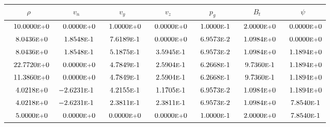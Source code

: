 \begin{tabular*}{\textwidth}{@{\extracolsep{\fill}} ccccccc}
\\ 
\hline 
\hline 
$\rho$ & $v_n$ & $v_y$ & $v_z$ & $p_g$ & $B_t$ & $\psi$ \\ 
\hline 
$\phantom{-} 10.0000\mbox{\sc{e}\smaller{+}}0$ & $\phantom{-} 0.0000\mbox{\sc{e}\smaller{+}}0$ & $\phantom{-} 1.0000\mbox{\sc{e}\smaller{+}}0$ & $\phantom{-} 0.0000\mbox{\sc{e}\smaller{+}}0$ & $\phantom{-} 1.0000\mbox{\sc{e}\smaller{-}}1$ & $\phantom{-} 2.0000\mbox{\sc{e}\smaller{+}}0$ & $\phantom{-} 0.0000\mbox{\sc{e}\smaller{+}}0$ \\ 
$\phantom{-} 8.0436\mbox{\sc{e}\smaller{+}}0$ & $\phantom{-} 1.8548\mbox{\sc{e}\smaller{-}}1$ & $\phantom{-} 7.6189\mbox{\sc{e}\smaller{-}}1$ & $\phantom{-} 0.0000\mbox{\sc{e}\smaller{+}}0$ & $\phantom{-} 6.9573\mbox{\sc{e}\smaller{-}}2$ & $\phantom{-} 1.0984\mbox{\sc{e}\smaller{+}}0$ & $\phantom{-} 0.0000\mbox{\sc{e}\smaller{+}}0$ \\ 
$\phantom{-} 8.0436\mbox{\sc{e}\smaller{+}}0$ & $\phantom{-} 1.8548\mbox{\sc{e}\smaller{-}}1$ & $\phantom{-} 5.1875\mbox{\sc{e}\smaller{-}}1$ & $\phantom{-} 3.5945\mbox{\sc{e}\smaller{-}}1$ & $\phantom{-} 6.9573\mbox{\sc{e}\smaller{-}}2$ & $\phantom{-} 1.0984\mbox{\sc{e}\smaller{+}}0$ & $\phantom{-} 1.1894\mbox{\sc{e}\smaller{+}}0$ \\ 
$\phantom{-} 22.7720\mbox{\sc{e}\smaller{+}}0$ & $\phantom{-} 0.0000\mbox{\sc{e}\smaller{+}}0$ & $\phantom{-} 4.7849\mbox{\sc{e}\smaller{-}}1$ & $\phantom{-} 2.5904\mbox{\sc{e}\smaller{-}}1$ & $\phantom{-} 6.2668\mbox{\sc{e}\smaller{-}}1$ & $\phantom{-} 9.7360\mbox{\sc{e}\smaller{-}}1$ & $\phantom{-} 1.1894\mbox{\sc{e}\smaller{+}}0$ \\ 
$\phantom{-} 11.3860\mbox{\sc{e}\smaller{+}}0$ & $\phantom{-} 0.0000\mbox{\sc{e}\smaller{+}}0$ & $\phantom{-} 4.7849\mbox{\sc{e}\smaller{-}}1$ & $\phantom{-} 2.5904\mbox{\sc{e}\smaller{-}}1$ & $\phantom{-} 6.2668\mbox{\sc{e}\smaller{-}}1$ & $\phantom{-} 9.7360\mbox{\sc{e}\smaller{-}}1$ & $\phantom{-} 1.1894\mbox{\sc{e}\smaller{+}}0$ \\ 
$\phantom{-} 4.0218\mbox{\sc{e}\smaller{+}}0$ & $-2.6231\mbox{\sc{e}\smaller{-}}1$ & $\phantom{-} 4.2155\mbox{\sc{e}\smaller{-}}1$ & $\phantom{-} 1.1705\mbox{\sc{e}\smaller{-}}1$ & $\phantom{-} 6.9573\mbox{\sc{e}\smaller{-}}2$ & $\phantom{-} 1.0984\mbox{\sc{e}\smaller{+}}0$ & $\phantom{-} 1.1894\mbox{\sc{e}\smaller{+}}0$ \\ 
$\phantom{-} 4.0218\mbox{\sc{e}\smaller{+}}0$ & $-2.6231\mbox{\sc{e}\smaller{-}}1$ & $\phantom{-} 2.3811\mbox{\sc{e}\smaller{-}}1$ & $\phantom{-} 2.3811\mbox{\sc{e}\smaller{-}}1$ & $\phantom{-} 6.9573\mbox{\sc{e}\smaller{-}}2$ & $\phantom{-} 1.0984\mbox{\sc{e}\smaller{+}}0$ & $\phantom{-} 7.8540\mbox{\sc{e}\smaller{-}}1$ \\ 
$\phantom{-} 5.0000\mbox{\sc{e}\smaller{+}}0$ & $\phantom{-} 0.0000\mbox{\sc{e}\smaller{+}}0$ & $\phantom{-} 0.0000\mbox{\sc{e}\smaller{+}}0$ & $\phantom{-} 0.0000\mbox{\sc{e}\smaller{+}}0$ & $\phantom{-} 1.0000\mbox{\sc{e}\smaller{-}}1$ & $\phantom{-} 2.0000\mbox{\sc{e}\smaller{+}}0$ & $\phantom{-} 7.8540\mbox{\sc{e}\smaller{-}}1$ \\ 
\hline 
\end{tabular*} 
